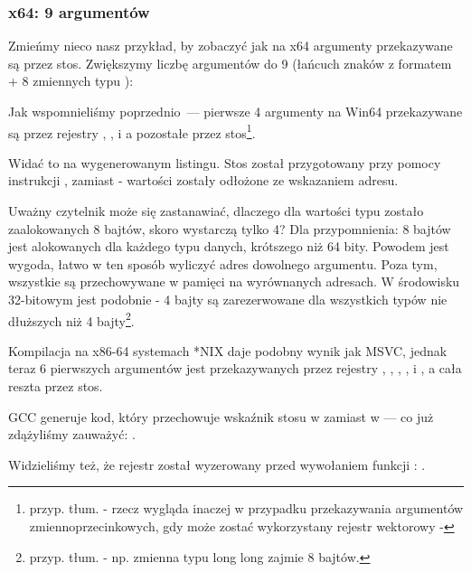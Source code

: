 \subsubsection{x64: 9 argumentów}

\label{example_printf8_x64}
Zmieńmy nieco nasz przykład, by zobaczyć jak na x64 argumenty przekazywane są przez stos.
Zwiększymy liczbę argumentów do 9 (łańcuch znaków z formatem + 8 zmiennych typu \Tint):




Jak wspomnieliśmy poprzednio~--- pierwsze 4 argumenty na Win64 przekazywane są przez rejestry \RCX, \RDX,  i  a pozostałe przez stos\footnote{przyp. tłum. - rzecz wygląda inaczej w przypadku przekazywania argumentów zmiennoprzecinkowych, gdy może zostać wykorzystany rejestr wektorowy -}.

Widać to na wygenerowanym listingu. Stos został przygotowany przy pomocy instrukcji \MOV, zamiast \PUSH - wartości zostały odłożone ze wskazaniem adresu.



Uważny czytelnik może się zastanawiać, dlaczego dla wartości typu \Tint zostało zaalokowanych 8 bajtów, skoro wystarczą tylko 4?
Dla przypomnienia: 8 bajtów jest alokowanych dla każdego typu danych, krótszego niż 64 bity.
Powodem jest wygoda, łatwo w ten sposób wyliczyć adres dowolnego argumentu. Poza tym, wszystkie są przechowywane w pamięci na wyrównanych adresach.
W środowisku 32-bitowym jest podobnie - 4 bajty są zarezerwowane dla wszystkich typów nie dłuższych niż 4 bajty\footnote{przyp. tłum. - np. zmienna typu long long zajmie 8 bajtów.}.


Kompilacja na x86-64 systemach *NIX daje podobny wynik jak MSVC, jednak teraz 6 pierwszych argumentów jest przekazywanych przez rejestry \RDI, \RSI,
\RDX, \RCX,  i , a cała reszta przez stos.

GCC generuje kod, który przechowuje wskaźnik stosu w \EDI zamiast w \RDI{} --- co już zdążyliśmy zauważyć: .

Widzieliśmy też, że rejestr \EAX został wyzerowany przed wywołaniem funkcji \printf: .

